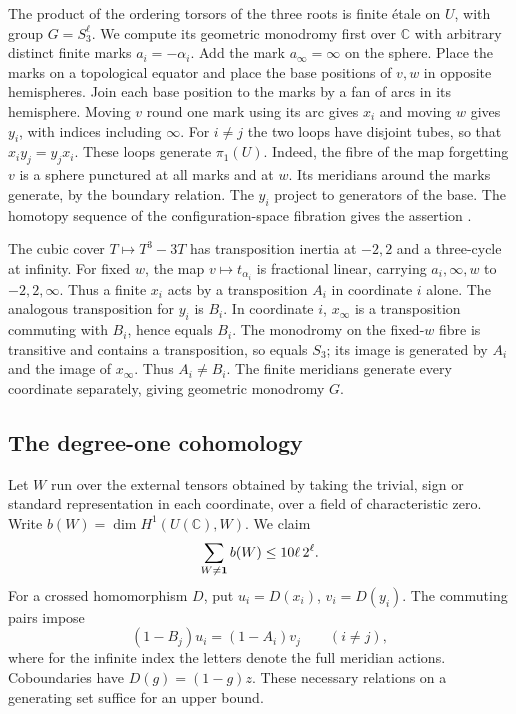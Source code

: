 \documentclass[preprint,12pt,numbers]{elsarticle}
\begin{document}
The product of the ordering torsors of the three roots is finite
\'etale on $U$, with group $G=S_3^\ell$. We compute its geometric
monodromy first over $\mathbb C$ with arbitrary distinct finite marks
$a_i=-\alpha_i$. Add the mark $a_\infty=\infty$ on the sphere. Place
the marks on a topological equator and place the base positions of
$v,w$ in opposite hemispheres. Join each base position to the marks
by a fan of arcs in its hemisphere. Moving $v$ round one mark using
its arc gives $x_i$ and moving $w$ gives $y_i$, with indices including
$\infty$. For $i\ne j$ the two loops have disjoint tubes, so that
$x_i y_j=y_j x_i$. These loops generate $\pi_1(U)$. Indeed, the fibre
of the map forgetting $v$ is a sphere punctured at all marks and at
$w$. Its meridians around the marks generate, by the boundary relation.
The $y_i$ project to generators of the base. The homotopy sequence of
the configuration-space fibration gives the assertion \cite{FN}.

The cubic cover $T\mapsto T^3-3T$ has transposition inertia at
$-2,2$ and a three-cycle at infinity. For fixed $w$, the map
$v\mapsto t_{\alpha_i}$ is fractional linear, carrying $a_i,\infty,w$
to $-2,2,\infty$. Thus a finite $x_i$ acts by a transposition $A_i$
in coordinate $i$ alone. The analogous transposition for $y_i$ is
$B_i$. In coordinate $i$, $x_\infty$ is a transposition commuting with
$B_i$, hence equals $B_i$. The monodromy on the fixed-$w$ fibre is
transitive and contains a transposition, so equals $S_3$; its image is
generated by $A_i$ and the image of $x_\infty$. Thus $A_i\ne B_i$.
The finite meridians generate every coordinate separately, giving
geometric monodromy $G$.

\subsection{The degree-one cohomology}

Let $W$ run over the external tensors obtained by taking the trivial,
sign or standard representation in each coordinate, over a field of
characteristic zero. Write $b(W)=\dim H^1(U(\mathbb C),W)$. We claim
\begin{equation}\label{eq:cubic-betti}
 \sum_{W\ne{\bf1}} b(W)\le 10\ell\,2^\ell .
\end{equation}
For a crossed homomorphism $D$, put $u_i=D(x_i)$, $v_i=D(y_i)$.
The commuting pairs impose
\begin{equation}\label{eq:cubic-meridians}
 (1-B_j)u_i=(1-A_i)v_j\qquad (i\ne j),
\end{equation}
where for the infinite index the letters denote the full meridian
actions. Coboundaries have $D(g)=(1-g)z$. These necessary relations
on a generating set suffice for an upper bound.
\end{document}
